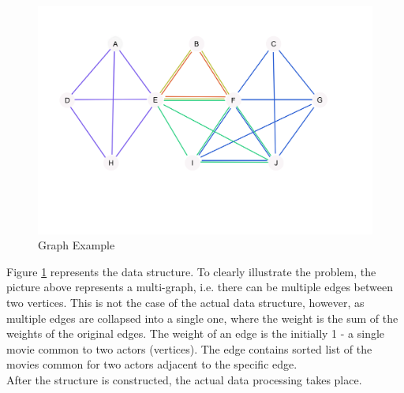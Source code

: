 \begin{figure}[ht!]
\centering
\includegraphics[width=130mm]{resources/project_problem_illustration.png}
\caption{Graph Example}
\label{example}
\end{figure}

Figure \ref{example} represents the data structure. To clearly illustrate the problem, the picture above represents a multi-graph, i.e. there can be multiple edges between two vertices. This is not the case of the actual data structure, however, as multiple edges are collapsed into a single one, where the weight is the sum of the weights of the original edges. The weight of an edge is the initially 1 - a single movie common to two actors (vertices). The edge contains sorted list of the movies common for two actors adjacent to the specific edge.
\\
After the structure is constructed, the actual data processing takes place.


